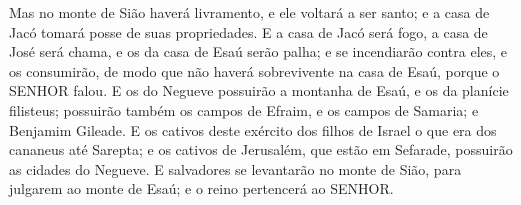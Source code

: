 {  Mas no monte de Sião haverá livramento, e ele voltará a ser santo; e a casa de Jacó tomará posse de suas propriedades.
  E a casa de Jacó será fogo, a casa de José será chama, e os da casa de Esaú serão palha; e se incendiarão contra eles, e os consumirão, de modo que não haverá sobrevivente na casa de Esaú, porque o SENHOR falou.
  E os do Negueve possuirão a montanha de Esaú, e os da planície
{} filisteus; possuirão também os campos de Efraim, e os campos de Samaria; e Benjamim
{} Gileade.
  E os cativos deste exército dos filhos de Israel
{} o que era dos cananeus até Sarepta;
 e os cativos de Jerusalém, que estão em Sefarade, possuirão as cidades do Negueve.
  E salvadores se levantarão no monte de Sião, para julgarem ao monte de Esaú; e o reino pertencerá ao SENHOR.\par }

